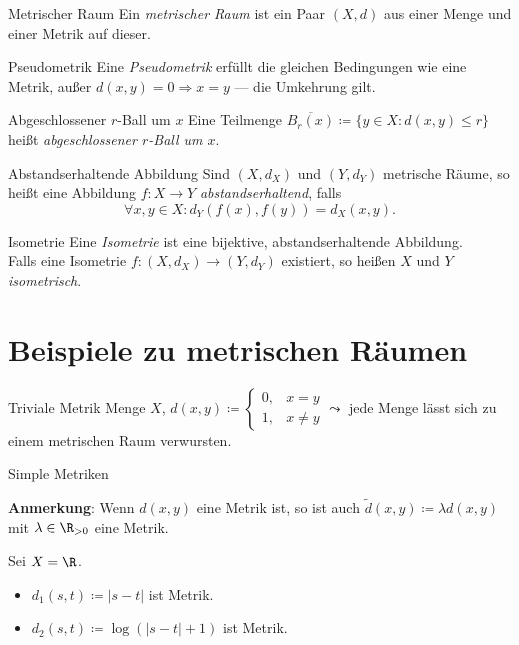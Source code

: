 \begin{definition}{Metrischer Raum}
  Ein \emph{metrischer Raum} ist ein Paar $ (X,d) $ aus einer Menge und einer Metrik auf dieser.
\end{definition}

\begin{definition}{Pseudometrik}
   Eine \emph{Pseudometrik} erfüllt die gleichen Bedingungen wie eine Metrik, außer $ d(x,y) = 0 \Rightarrow x = y $ --- die Umkehrung gilt.
\end{definition}

\begin{definition}{Abgeschlossener $ r $-Ball um $ x $}
  Eine Teilmenge $ \overline{B_r(x)} \coloneqq \{ y \in X : d(x,y) \leq r \} $ heißt \emph{abgeschlossener $ r $-Ball um $ x $}.
\end{definition}

\begin{definition}{Abstandserhaltende Abbildung}
  Sind $ (X, d_X) $ und $ (Y, d_Y) $ metrische Räume, so heißt eine Abbildung $ f: X \to Y $ \emph{abstandserhaltend}, falls
  \begin{equation*}
    \forall x, y \in X: d_Y(f(x), f(y)) = d_X(x, y)\text{.}
  \end{equation*}
\end{definition}

\begin{definition}{Isometrie}
  Eine \emph{Isometrie} ist eine bijektive, abstandserhaltende Abbildung. \\
  Falls eine Isometrie $ f: (X, d_X) \to (Y, d_Y) $ existiert, so heißen $ X $ und $ Y $ \emph{isometrisch}.
\end{definition}

\section{Beispiele zu metrischen Räumen}

\begin{example}{Triviale Metrik}
  Menge $ X $, $ d(x, y) \coloneqq \begin{cases}
    0, &x = y \\
    1, & x \neq y
  \end{cases} \leadsto $ jede Menge lässt sich zu einem metrischen Raum verwursten. 
\end{example}

\begin{example}{Simple Metriken}
  \begin{marginfigure}
    \textbf{Anmerkung}: Wenn $ d(x, y) $ eine Metrik ist, so ist auch $ \widetilde{d}(x, y) \coloneqq \lambda d(x, y) $ mit $ \lambda \in \R_{>0} $ eine Metrik.
  \end{marginfigure}
  Sei $ X = \R $.
  \begin{itemize}
    \item $ d_1(s, t) \coloneqq |s-t| $ ist Metrik.
    \item $ d_2(s, t) \coloneqq \log(|s-t|+1) $ ist Metrik.
  \end{itemize}
\end{example}

